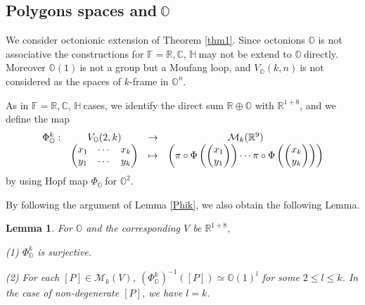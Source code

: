 \documentclass[a4paper]{article}%
\newtheorem{lemma}[theorem]{Lemma}
\begin{document}
\subsection{Polygons spaces and$\ \mathbb{O}$}

We consider octonionic extension of Theorem \ref{thm1}. Since octonions
$\mathbb{O}$ is not associative the constructions for $\mathbb{F}%
=\mathbb{R},\mathbb{C}$, $\mathbb{H\ }$may not be extend to $\mathbb{O\ }%
$directly. Moreover $\mathbb{O}\left(  1\right)  \ $is not a group but a
Moufang loop, and $V_{\mathbb{O}}(k,n)\ $is not considered as the spaces of
$k$-frame in $\mathbb{O}^{n}$.

As in $\mathbb{F}=\mathbb{R},\mathbb{C}$, $\mathbb{H\ }$cases, we identify the
direct sum $\mathbb{R}\oplus\mathbb{O}$ with $\mathbb{R}^{1+8}$, and we define
the map%
\[%
\begin{array}
[c]{cccc}%
\Phi_{\mathbb{O}}^{k}: & V_{\mathbb{O}}(2,k) & \rightarrow & \mathcal{M}%
_{k}(\mathbb{R}^{9})\\
&
\begin{pmatrix}
x_{1} & \cdots & x_{k}\\
y_{1} & \cdots & y_{k}%
\end{pmatrix}
& \mapsto & \left(  \pi\circ\Phi\left(
\begin{pmatrix}
x_{1}\\
y_{1}%
\end{pmatrix}
\right)  \cdots\pi\circ\Phi\left(
\begin{pmatrix}
x_{k}\\
y_{k}%
\end{pmatrix}
\right)  \right)
\end{array}
\]
by using Hopf map $\Phi_{\mathbb{O}}\ $for $\mathbb{O}^{2}$.

By following the argument of Lemma \ref{Phik}, we also obtain the following Lemma.

\begin{lemma}
For $\mathbb{O}$ and the corresponding $V$ be $\mathbb{R}^{1+8}$,

(1) $\Phi_{\mathbb{O}}^{k}$ is surjective.

(2) For each $[P]\in\mathcal{M}_{k}(V)$, $(\Phi_{\mathbb{O}}^{k}%
)^{-1}([P])\simeq\mathbb{O}(1)^{l}$ for some $2\leq l\leq k$. In the case of
non-degenerate $[P]$, we have $l=k$.
\end{lemma}
\end{document}
